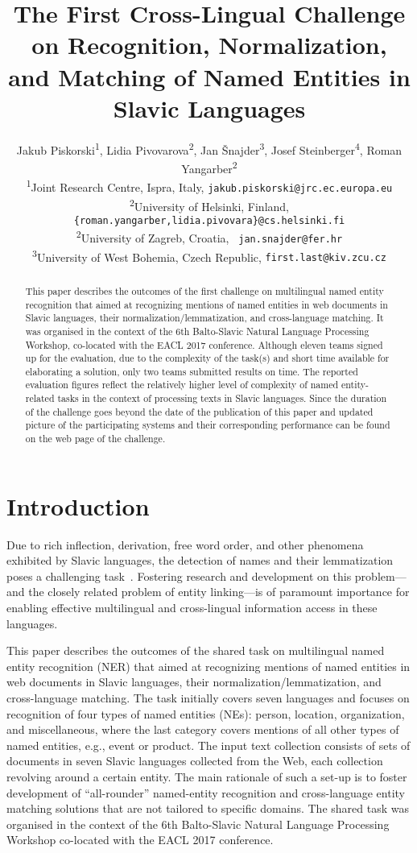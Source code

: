 \documentclass[11pt]{article}
\title{The First Cross-Lingual Challenge on Recognition,
  Normalization,  
  \\ and Matching of Named Entities in Slavic Languages}
\author{Jakub Piskorski\textsuperscript{1},
  Lidia Pivovarova\textsuperscript{2},
  Jan Šnajder\textsuperscript{3},
  Josef Steinberger\textsuperscript{4},
  Roman Yangarber\textsuperscript{2} \\
  \textsuperscript{1}Joint Research Centre,
  \comment{Via Enrico Fermi 2749, 21027}Ispra\comment{ (VA)}, Italy,
  {\small \tt jakub.piskorski@jrc.ec.europa.eu} \\
  \textsuperscript{2}University of Helsinki, Finland, {\small \tt
  \{roman.yangarber,lidia.pivovara\}@cs.helsinki.fi}\\
    \textsuperscript{2}University of Zagreb, Croatia, {\small \tt
    jan.snajder@fer.hr} \\
  \textsuperscript{3}University of West Bohemia, Czech Republic, 
  {\small \tt first.last@kiv.zcu.cz} 
  }
\date{}
\begin{document}
\maketitle
\begin{abstract}

This paper describes the outcomes of the first challenge on multilingual named entity recognition 
that aimed at recognizing mentions of named entities in web documents in Slavic languages, 
their normalization/lemmatization, and cross-language matching. It was organised in 
the context of the 6th Balto-Slavic Natural Language Processing Workshop, co-located with the 
EACL 2017 conference. Although eleven teams signed up for the evaluation, due to the complexity
of the task(s) and short time available for elaborating a solution, only two teams submitted results
on time. The reported evaluation figures reflect the relatively higher level of complexity of 
named entity-related tasks in the context of processing texts in Slavic languages. Since the 
duration of the challenge goes beyond the date of the publication of this paper and updated
picture of the participating systems and their corresponding performance can be found on
the web page of the challenge.

\end{abstract}

\section{Introduction}
\label{sec:intro}

Due to rich inflection, derivation, free word order, and other phenomena
exhibited by Slavic languages, the detection of names and their
lemmatization poses a challenging
task~\cite{Przepiorkowski:2007:SIE:1567545.1567547,journals/ir/PiskorskiWS09}.
Fostering research and development on this problem---and the closely
related problem of entity linking---is of paramount importance for
enabling effective multilingual and cross-lingual information access in
these languages.

This paper describes the outcomes of the shared task on multilingual
named entity recognition {(NER)} that aimed at recognizing mentions
of named entities in web documents in Slavic languages, their
normalization/lemmatization, and cross-language matching.  The task
initially covers seven languages and focuses on recognition of four types
of named entities (NEs): person, location, organization, and
miscellaneous, where the last category covers mentions of all other types
of named entities, e.g., event or product.  The input text collection
consists of sets of documents in {seven Slavic languages} collected from
the Web, each collection revolving around a certain entity. The main
rationale of such a set-up is to foster development of ``all-rounder''
named-entity recognition and cross-language entity matching solutions
that are not tailored to specific domains.  The shared task was organised
in the context of the 6th Balto-Slavic Natural Language Processing
Workshop co-located with the EACL 2017 conference.
\end{document}
